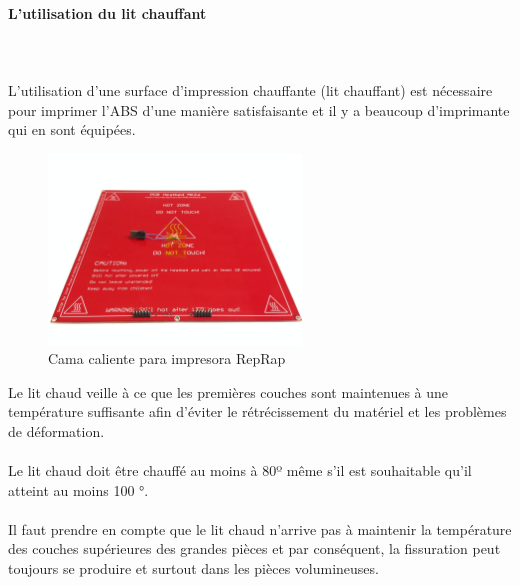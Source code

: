 \documentclass[11pt,a4paper]{article}
\begin{document}
			\paragraph{L'utilisation du lit chauffant}\mbox{}\\\\
L'utilisation d’une surface d’impression chauffante (lit chauffant) est nécessaire pour imprimer l’ABS d’une manière satisfaisante et il y a beaucoup d’imprimante qui en sont équipées.
\begin{figure}[H]
\centering
\includegraphics[width=0.6\textwidth,cfbox=azul_marcos 4pt 0pt]{FOTOS/HEATEDBED}
\caption*{Cama caliente para impresora RepRap}
\end{figure}
Le lit chaud veille à ce que les premières couches sont maintenues à une température suffisante afin d’éviter le rétrécissement du matériel et les problèmes de déformation.
\\\\
Le lit chaud doit être chauffé au moins à 80º même s’il est souhaitable qu’il atteint au moins 100 °.
\\\\
Il faut prendre en compte que le lit chaud n’arrive pas à maintenir la température des couches supérieures des grandes pièces  et par conséquent, la fissuration peut toujours se produire et surtout dans les pièces volumineuses.
\end{document}
